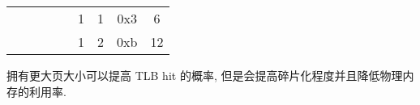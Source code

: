 \documentclass[11pt]{homework}
\begin{document}
\begin{arabicparts}
{\begin{tabular}{|c|c|c|c|c|c|c|c|c|}
            \cline{6-9}
                                     &                                                                        &                                                                   &                                                                    &                                                                      & 1                        & 1         & 0x3 & 6             \\
            \cline{6-9}
                                     &                                                                        &                                                                   &                                                                    &                                                                      & 1                        & 2         & 0xb & 12            \\
            \hline
        \end{tabular}
    }
    \questionpart 拥有更大页大小可以提高 TLB hit 的概率, 但是会提高碎片化程度并且降低物理内存的利用率.


\end{arabicparts}
\end{document}

